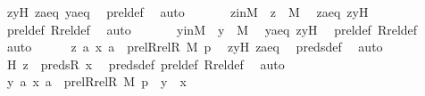 \begin{isabellebody}
\ zyH\ zaeq\ yaeq\ \isamarkupfalse%
\ prel{\isacharunderscore}{\kern0pt}def\ \isamarkupfalse%
\ auto\ \isanewline
\isanewline
\ \ \ \ \isamarkupfalse%
\ zinM\ {\isacharcolon}{\kern0pt}\ {\isachardoublequoteopen}z\ {\isasymin}\ M{\isachardoublequoteclose}\ \isamarkupfalse%
\ zaeq\ zyH\ \isamarkupfalse%
\ prel{\isacharunderscore}{\kern0pt}def\ Rrel{\isacharunderscore}{\kern0pt}def\ \isamarkupfalse%
\ auto\ \isanewline
\ \ \ \ \isamarkupfalse%
\ yinM\ {\isacharcolon}{\kern0pt}\ {\isachardoublequoteopen}y\ {\isasymin}\ M{\isachardoublequoteclose}\ \isamarkupfalse%
\ yaeq\ zyH\ \isamarkupfalse%
\ prel{\isacharunderscore}{\kern0pt}def\ Rrel{\isacharunderscore}{\kern0pt}def\ \isamarkupfalse%
\ auto\isanewline
\isanewline
\ \ \ \ \isamarkupfalse%
\ {\isachardoublequoteopen}{\isacharless}{\kern0pt}{\isacharless}{\kern0pt}z{\isacharcomma}{\kern0pt}\ a{\isachargreater}{\kern0pt}{\isacharcomma}{\kern0pt}\ {\isacharless}{\kern0pt}x{\isacharcomma}{\kern0pt}\ a{\isachargreater}{\kern0pt}{\isachargreater}{\kern0pt}\ {\isasymin}\ prel{\isacharparenleft}{\kern0pt}Rrel{\isacharparenleft}{\kern0pt}R{\isacharcomma}{\kern0pt}\ M{\isacharparenright}{\kern0pt}{\isacharcomma}{\kern0pt}\ p{\isacharparenright}{\kern0pt}{\isachardoublequoteclose}\ \isamarkupfalse%
\ zyH\ zaeq\ \isamarkupfalse%
\ preds{\isacharunderscore}{\kern0pt}def\ \isamarkupfalse%
\ auto\isanewline
\ \ \ \ \isamarkupfalse%
\ \isamarkupfalse%
\ H{}{\isacharcolon}{\kern0pt}\ {\isachardoublequoteopen}z\ {\isasymin}\ preds{\isacharparenleft}{\kern0pt}R{\isacharcomma}{\kern0pt}\ x{\isacharparenright}{\kern0pt}{\isachardoublequoteclose}\ \isamarkupfalse%
\ preds{\isacharunderscore}{\kern0pt}def\ prel{\isacharunderscore}{\kern0pt}def\ Rrel{\isacharunderscore}{\kern0pt}def\ \isamarkupfalse%
\ auto\ \isanewline
\isanewline
\ \ \ \ \isamarkupfalse%
\ {\isachardoublequoteopen}{\isacharless}{\kern0pt}{\isacharless}{\kern0pt}y{\isacharcomma}{\kern0pt}\ a{\isachargreater}{\kern0pt}{\isacharcomma}{\kern0pt}\ {\isacharless}{\kern0pt}x{\isacharcomma}{\kern0pt}\ a{\isachargreater}{\kern0pt}{\isachargreater}{\kern0pt}\ {\isasymin}\ prel{\isacharparenleft}{\kern0pt}Rrel{\isacharparenleft}{\kern0pt}R{\isacharcomma}{\kern0pt}\ M{\isacharparenright}{\kern0pt}{\isacharcomma}{\kern0pt}\ p{\isacharparenright}{\kern0pt}\ {\isasymor}\ y\ {\isacharequal}{\kern0pt}\ x{\isachardoublequoteclose}\ \isamarkupfalse%

\end{isabellebody}
